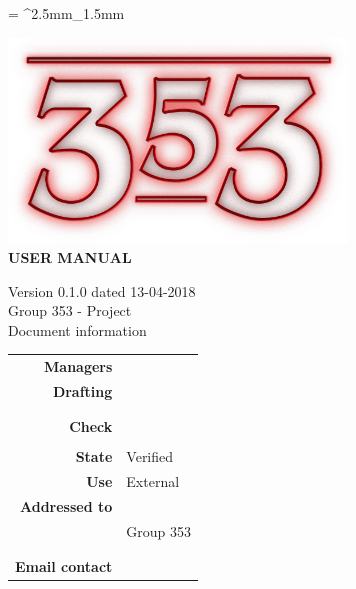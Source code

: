 \documentclass[openany, a4paper, 12pt]{report}
\begin{document}
	
	\tabulinesep = ^2.5mm_1.5mm
	
	\begin{titlepage}
		\centering
		\vfill
		{
			\bfseries
			\vskip2cm
			\includegraphics[width=9cm]{../../common/images/logo.png} \\
			\vfill
			\Huge{USER MANUAL}\\
			\vfill

			\Large Version 0.1.0 dated 13-04-2018\\ 
			\large Group 353 - Project \progetto \\
			\vfill
			\normalsize Document information\\
			\begin{table}[htbp]
				\centering
				\renewcommand\arraystretch{1.2}
				\begin{tabular}{r|l}
					\hline

					\textbf{Managers}		& \Valentina \\
					
					\textbf{Drafting} 		& \Davide \\
											& \Gianluca \\
											& \Riccardo \\
											
					\textbf{Check} 			& \Mirco \\	
											& \Parwinder \\
											
					\textbf{State} 			& Verified\\
					\textbf{Use}			& External\\
					\textbf{Addressed to}   & \Proponente\\
										& Group 353\\
										& \Vardanega\\
										& \Cardin\\
					
					\textbf{Email contact}	& \mailgroup
				\end{tabular}
			\end{table}
			\vfill
		}    
	\end{titlepage}
	
	\renewcommand{\contentsname}{Index}
	\tableofcontents
	\renewcommand{\listfigurename}{List of Figures}
	\listoffigures
	\newpage
	
	
	
	
	
	
	
	
\end{document}
